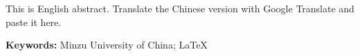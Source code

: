 
\begin{enabstract}

    This is English abstract. Translate the Chinese version with Google Translate and paste it here.

    \noindent\textbf{Keywords:} Minzu University of China; \LaTeX

\end{enabstract}

